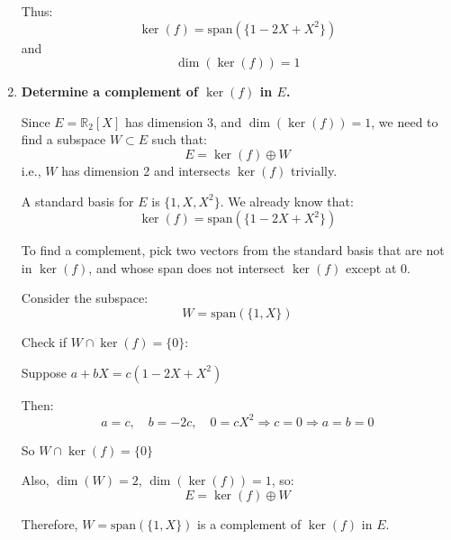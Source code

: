\documentclass[12pt]{article}
\begin{document}
\begin{answerbox}
\begin{enumerate}
    Thus:
    $$
    \ker(f) = \text{span}\left(\{1 - 2X + X^2\}\right)
    $$
    and
    $$
    \dim(\ker(f)) = 1
    $$

    \item \textbf{Determine a complement of $ \ker(f) $ in $ E $.}

    Since $ E = \mathbb{R}_2[X] $ has dimension 3, and $ \dim(\ker(f)) = 1 $, we need to find a subspace $ W \subset E $ such that:
    $$
    E = \ker(f) \oplus W
    $$
    i.e., $ W $ has dimension 2 and intersects $ \ker(f) $ trivially.

    A standard basis for $ E $ is $ \{1, X, X^2\} $. We already know that:
    $$
    \ker(f) = \text{span}\left(\{1 - 2X + X^2\}\right)
    $$

    To find a complement, pick two vectors from the standard basis that are not in $ \ker(f) $, and whose span does not intersect $ \ker(f) $ except at 0.

    Consider the subspace:
    $$
    W = \text{span}\left(\{1, X\}\right)
    $$

    Check if $ W \cap \ker(f) = \{0\} $:

    Suppose $ a + bX = c(1 - 2X + X^2) $

    Then:
    $$
    a = c,\quad b = -2c,\quad 0 = cX^2
    \Rightarrow c = 0 \Rightarrow a = b = 0
    $$

    So $ W \cap \ker(f) = \{0\} $

    Also, $ \dim(W) = 2 $, $ \dim(\ker(f)) = 1 $, so:
    $$
    E = \ker(f) \oplus W
    $$

    Therefore, $ W = \text{span}(\{1, X\}) $ is a complement of $ \ker(f) $ in $ E $.

\end{enumerate}
\end{answerbox}

\end{document}
